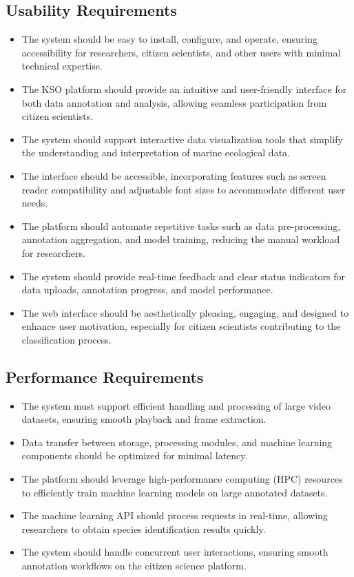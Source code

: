 \subsection{Usability Requirements}
\begin{itemize}
    \item The system should be easy to install, configure, and operate, ensuring accessibility for researchers, citizen scientists, and other users with minimal technical expertise.
    \item The KSO platform should provide an intuitive and user-friendly interface for both data annotation and analysis, allowing seamless participation from citizen scientists.
    \item The system should support interactive data visualization tools that simplify the understanding and interpretation of marine ecological data.
    \item The interface should be accessible, incorporating features such as screen reader compatibility and adjustable font sizes to accommodate different user needs.
    \item The platform should automate repetitive tasks such as data pre-processing, annotation aggregation, and model training, reducing the manual workload for researchers.
    \item The system should provide real-time feedback and clear status indicators for data uploads, annotation progress, and model performance.
    \item The web interface should be aesthetically pleasing, engaging, and designed to enhance user motivation, especially for citizen scientists contributing to the classification process.
\end{itemize}

\subsection{Performance Requirements}
\begin{itemize}
    \item The system must support efficient handling and processing of large video datasets, ensuring smooth playback and frame extraction.
    \item Data transfer between storage, processing modules, and machine learning components should be optimized for minimal latency.
    \item The platform should leverage high-performance computing (HPC) resources to efficiently train machine learning models on large annotated datasets.
    \item The machine learning API should process requests in real-time, allowing researchers to obtain species identification results quickly.
    \item The system should handle concurrent user interactions, ensuring smooth annotation workflows on the citizen science platform.
\end{itemize}

